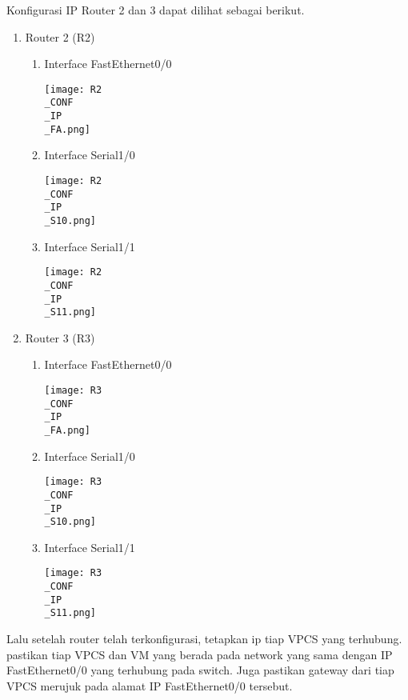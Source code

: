 \documentclass[12pt, a4paper]{article}
\begin{document}
  Konfigurasi IP Router 2 dan 3 dapat dilihat sebagai berikut.
  \begin{enumerate}
    \item Router 2 (R2)
      \begin{enumerate}
        \item Interface FastEthernet0/0
          \begin{center}
            \texttt{[image: R2\\\_CONF\\\_IP\\\_FA.png]}
          \end{center}

        \item Interface Serial1/0
          \begin{center}
            \texttt{[image: R2\\\_CONF\\\_IP\\\_S10.png]}
          \end{center}

        \item Interface Serial1/1
          \begin{center}
            \texttt{[image: R2\\\_CONF\\\_IP\\\_S11.png]}
          \end{center}
      \end{enumerate}
    \item Router 3 (R3)
      \begin{enumerate}
        \item Interface FastEthernet0/0
          \begin{center}
            \texttt{[image: R3\\\_CONF\\\_IP\\\_FA.png]}
          \end{center}

        \item Interface Serial1/0
          \begin{center}
            \texttt{[image: R3\\\_CONF\\\_IP\\\_S10.png]}
          \end{center}

        \item Interface Serial1/1
          \begin{center}
            \texttt{[image: R3\\\_CONF\\\_IP\\\_S11.png]}
          \end{center}
      \end{enumerate}
  \end{enumerate}

  Lalu setelah router telah terkonfigurasi, tetapkan ip tiap VPCS yang terhubung.
  pastikan tiap VPCS dan VM yang berada pada network yang sama dengan
  IP FastEthernet0/0 yang terhubung pada switch. Juga pastikan gateway dari
  tiap VPCS merujuk pada alamat IP FastEthernet0/0 tersebut.
\end{document}
